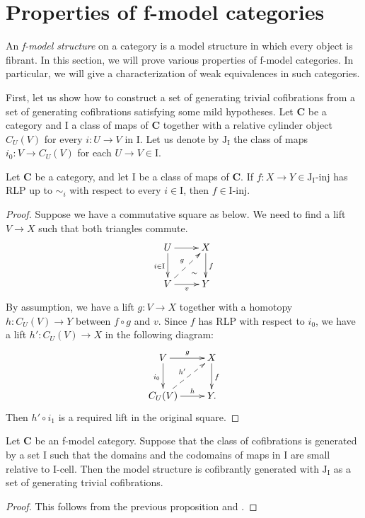 \documentclass{amsart}
\theoremstyle{definition}
\newcommand{\cat}[1]{\mathbf{#1}}
\newcommand{\C}{\cat{C}}
\newcommand{\I}{\mathrm{I}}
\newcommand{\J}{\mathrm{J}}
\newcommand{\class}[2]{#1\text{-}\mathrm{#2}}
\newcommand{\Iinj}[1][\I]{\class{#1}{inj}}
\newcommand{\Icell}[1][\I]{\class{#1}{cell}}
\newcommand{\Jinj}[1][]{\Iinj[\J#1]}
\newcommand{\cyli}{i}
\begin{document}
\section{Properties of f-model categories}

An \emph{f-model structure} on a category is a model structure in which every object is fibrant.
In this section, we will prove various properties of f-model categories.
In particular, we will give a characterization of weak equivalences in such categories.

First, let us show how to construct a set of generating trivial cofibrations from a set of generating cofibrations satisfying some mild hypotheses.
Let $\C$ be a category and $\I$ a class of maps of $\C$ together with a relative cylinder object $C_U(V)$ for every $i : U \to V$ in $\I$.
Let us denote by $\J_\I$ the class of maps $\cyli_0 : V \to C_U(V)$ for each $U \to V \in \I$.

\begin{prop}
Let $\C$ be a category, and let $\I$ be a class of maps of $\C$.
If $f : X \to Y \in \Jinj[_\I]$ has RLP up to $\sim_i$ with respect to every $i \in \I$, then $f \in \Iinj$.
\end{prop}
\begin{proof}
Suppose we have a commutative square as below.
We need to find a lift $V \to X$ such that both triangles commute.
\[ \xymatrix{ U \ar[d]_{i \in \I} \ar[r] \ar@{}[dr]|(.7){\sim} & X \ar[d]^f \\
              V \ar[r]_v \ar@{-->}[ur]^g                       & Y
            } \]
By assumption, we have a lift $g : V \to X$ together with
a homotopy $h : C_U(V) \to Y$ between $f \circ g$ and $v$.
Since $f$ has RLP with respect to $\cyli_0$, we have a lift $h' : C_U(V) \to X$ in the following diagram:
\[ \xymatrix{ V \ar[r]^g \ar[d]_{\cyli_0}         & X \ar[d]^f \\
              C_U(V) \ar[r]^-h \ar@{-->}[ur]^{h'} & Y.
            } \]
Then $h' \circ \cyli_1$ is a required lift in the original square.
\end{proof}

\begin{cor}
Let $\C$ be an f-model category.
Suppose that the class of cofibrations is generated by a set $\I$ such that
the domains and the codomains of maps in $\I$ are small relative to $\Icell$.
Then the model structure is cofibrantly generated with $\J_\I$ as a set of generating trivial cofibrations.
\end{cor}
\begin{proof}
This follows from the previous proposition and .
\end{proof}
\end{document}
